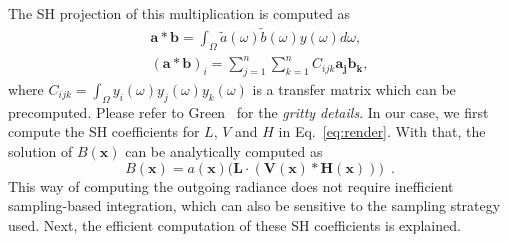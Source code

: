 %
The SH projection of this multiplication is computed as 
%
%
\begin{align}
\label{eq:SH_mult}
\mathbf{a} * \mathbf{b} = \int_{\Omega} \tilde{a}(\omega) \tilde{b}(\omega) y(\omega) d\omega , \\
(\mathbf{a} * \mathbf{b})_i = \sum_{j=1}^{n} \sum_{k=1}^{n} C_{ijk} \mathbf{a_j} \mathbf{b_k} , 
\end{align}
%
%
where $C_{ijk} = \int_{\Omega} y_i(\omega) y_j(\omega) y_k(\omega)$ is a transfer matrix which can be precomputed. 
%
Please refer to Green~\cite{green2003spherical} for the \emph{gritty details}.
%
In our case, we first compute the SH coefficients for $L$, $V$ and $H$ in Eq.~\ref{eq:render}. 
%
With that, the solution of $B(\mathbf{x})$ can be analytically computed as 
%
%
\begin{equation}
B(\mathbf{x}) = a(\mathbf{x}) \Big(\boldsymbol{L} \cdot (\boldsymbol{V}(\mathbf{x}) * \boldsymbol{H}(\mathbf{x})) \Big) \enspace{.}
\end{equation}
%
%
This way of computing the outgoing radiance does not require inefficient sampling-based integration, which can also be sensitive to the sampling strategy used. 
%
Next, the efficient computation of these SH coefficients is explained. 
%
%
